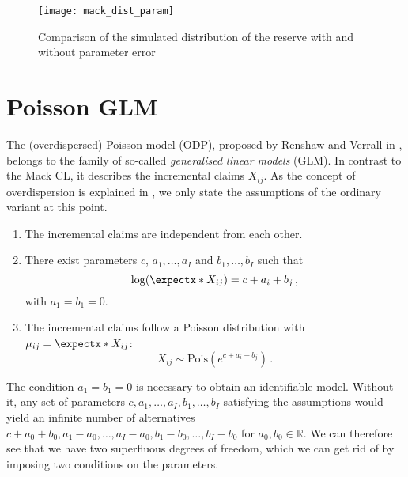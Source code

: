 \documentclass[a4paper]{book}
\begin{document}
\begin{figure}
  \texttt{[image: mack\_dist\_param]}
  \caption{Comparison of the simulated distribution of the reserve with and without parameter error}
\end{figure}

\chapter{Poisson GLM} \label{chapter:poisson}

The (overdispersed) Poisson model (ODP), proposed by Renshaw and Verrall in \cite{renshaw}, belongs to the family of so-called \emph{generalised linear models} (GLM). In contrast to the Mack CL, it describes the incremental claims $X_{ij}$. As the concept of overdispersion is explained in , we only state the assumptions of the ordinary variant at this point.

\begin{model} \leavevmode \label{model:poisson}
  \begin{enumerate}
      \item \label{assump:poisson1}
      The incremental claims are independent from each other.
      \item \label{assump:poisson2}
      There exist parameters $c$, $a_1, \dots, a_I$ and $b_1, \dots, b_I$ such that
      \begin{equation} \label{eq:linear-predictor-poisson}
          \log(\expect{X_{ij}}) = c + a_i + b_j \,,
      \end{equation}
      with $a_1 = b_1 = 0$.
      \item \label{assump:poisson3}
      The incremental claims follow a Poisson distribution with $\mu_{ij} = \expect{X_{ij}}$:
      \begin{equation}
          X_{ij} \sim \mathrm{Pois}(e^{c + a_i + b_j}) \,.
      \end{equation}
  \end{enumerate}
\end{model}

The condition $a_1 = b_1 = 0$ is necessary to obtain an identifiable model. Without it, any set of parameters $c, a_1, \dots, a_I, b_1, \dots, b_I$ satisfying the assumptions would yield an infinite number of alternatives $c + a_0 + b_0, a_1 - a_0, \dots, a_I - a_0, b_1 - b_0, \dots, b_I - b_0$ for $a_0, b_0 \in \mathbb{R}$. We can therefore see that we have two superfluous degrees of freedom, which we can get rid of by imposing two conditions on the parameters. 
\end{document}
